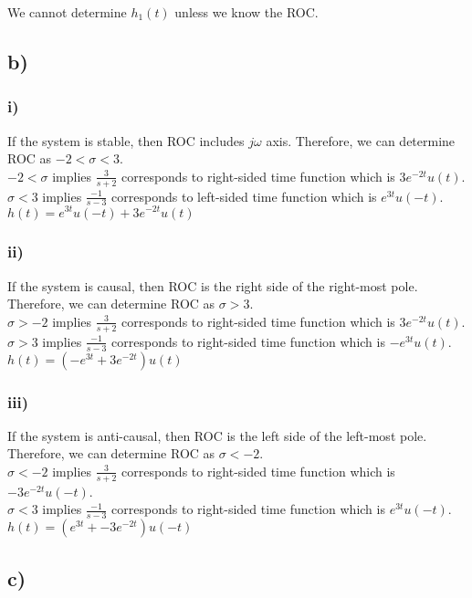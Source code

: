 \documentclass[12pt]{article}
\begin{document}
    We cannot determine \(h_1(t)\) unless we know the ROC.
    \subsection*{b)}
    \subsubsection*{i)} 
    If the system is stable, then ROC includes \(j\omega\) axis. Therefore, we can determine ROC as \(-2 < \sigma < 3\).\\
    \(-2 < \sigma\) implies \(\frac{3}{s+2}\) corresponds to right-sided time function which is \(3e^{-2t}u(t)\).\\
    \(\sigma < 3\) implies \(\frac{-1}{s-3}\) corresponds to left-sided time function which is \(e^{3t}u(-t)\).\\
    \(h(t) = e^{3t}u(-t) + 3e^{-2t}u(t)\)      

    \subsubsection*{ii)}
    If the system is causal, then ROC is the right side of the right-most pole. Therefore, we can determine ROC as \(\sigma > 3\).\\
    \(\sigma > -2\) implies \(\frac{3}{s+2}\) corresponds to right-sided time function which is \(3e^{-2t}u(t)\).\\
    \(\sigma > 3\) implies \(\frac{-1}{s-3}\) corresponds to right-sided time function which is \(-e^{3t}u(t)\).\\
    \(h(t) = (-e^{3t} + 3e^{-2t})u(t)\) 
    
    \subsubsection*{iii)}
    If the system is anti-causal, then ROC is the left side of the left-most pole. Therefore, we can determine ROC as \(\sigma < -2\).\\
    \(\sigma < -2\) implies \(\frac{3}{s+2}\) corresponds to right-sided time function which is \(-3e^{-2t}u(-t)\).\\
    \(\sigma < 3\) implies \(\frac{-1}{s-3}\) corresponds to right-sided time function which is \(e^{3t}u(-t)\).\\
    \(h(t) = (e^{3t} + -3e^{-2t})u(-t)\) 
    
    \subsection*{c)}
\end{document}
